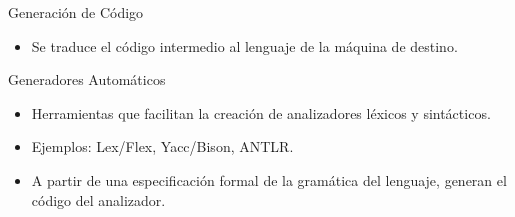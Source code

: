 \documentclass{beamer}
\begin{document}
	\begin{frame}{Generación de Código}
		
		\begin{itemize}
			\item Se traduce el código intermedio al lenguaje de la máquina de destino.
		\end{itemize}
		
	\end{frame}
	
	\begin{frame}{Generadores Automáticos}
		
		\begin{itemize}
			\item Herramientas que facilitan la creación de analizadores léxicos y sintácticos.
			\item Ejemplos: Lex/Flex, Yacc/Bison, ANTLR.
			\item A partir de una especificación formal de la gramática del lenguaje, generan el código del analizador.
		\end{itemize}
		
	\end{frame}
	
\end{document}
